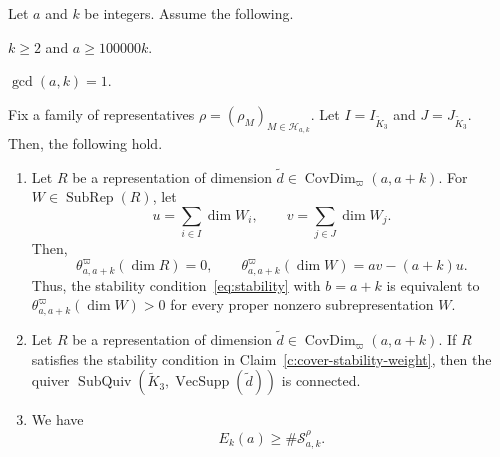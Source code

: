 \begin{lemma}\label{lem:cover-localization}
Let $a$ and $k$ be integers. Assume the following.
\begin{hypotheses}
\item\label{hyp:localization-dimensions} $k\ge2$ and $a\ge100000k$.
\item\label{hyp:localization-coprimality} $\gcd(a,k)=1$.
\end{hypotheses}
Fix a family of representatives $\rho=(\rho_M)_{M\in\mathcal H_{a,k}}$.
Let $I=I_{\widetilde K_3}$ and $J=J_{\widetilde K_3}$.
Then, the following hold.
\begin{enumerate}
\item\label{c:cover-stability-weight} Let $R$ be a representation of dimension $\widetilde d\in\operatorname{CovDim}_{\varpi}(a,a+k)$.
For $W\in\operatorname{SubRep}(R)$, let
\[
 u=\sum_{i\in I}\dim W_i,\qquad v=\sum_{j\in J}\dim W_j.
\]
Then,
\[
 \theta^{\varpi}_{a,a+k}(\dim R)=0,\qquad
 \theta^{\varpi}_{a,a+k}(\dim W)=av-(a+k)u.
\]
Thus, the stability condition~\eqref{eq:stability} with $b=a+k$ is equivalent to
$\theta^{\varpi}_{a,a+k}(\dim W)>0$ for every proper nonzero subrepresentation $W$.
\item\label{c:cover-stability-connected} Let $R$ be a representation of dimension $\widetilde d\in\operatorname{CovDim}_{\varpi}(a,a+k)$.
If $R$ satisfies the stability condition in Claim~\ref{c:cover-stability-weight},
then the quiver $\operatorname{SubQuiv}(\widetilde K_3,\operatorname{VecSupp}(\widetilde d))$ is connected.
\item\label{c:cover-localization-bound} We have
\[
 E_k(a)\ge\#\mathcal S_{a,k}^\rho.
\]
\end{enumerate}
\end{lemma}
